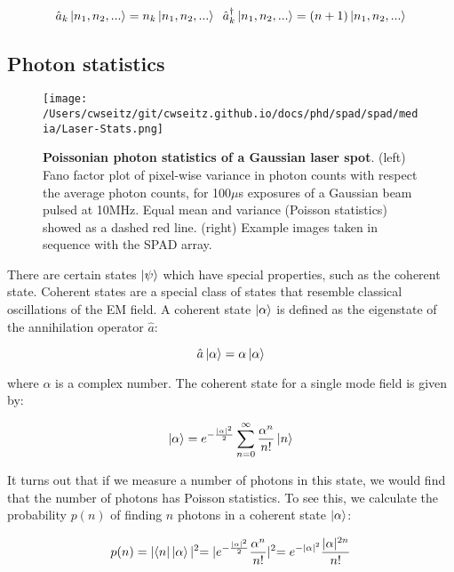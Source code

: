 \begin{equation*}
\hat{a}_k \ket{n_1, n_2, ...} = n_k \ket{n_1, n_2, ...} \;\;
\hat{a}_k^\dagger \ket{n_1, n_2, ...} = (n+1) \ket{n_1, n_2, ...}
\end{equation*}

\subsection{Photon statistics}

\begin{figure*}[t]
\centering
\texttt{[image: /Users/cwseitz/git/cwseitz.github.io/docs/phd/spad/spad/media/Laser-Stats.png]}
\caption{\textbf{Poissonian photon statistics of a Gaussian laser spot}. (left) Fano factor plot of pixel-wise variance in photon counts with respect the average photon counts, for 100$\mu$s exposures of a Gaussian beam pulsed at 10MHz. Equal mean and variance (Poisson statistics) showed as a dashed red line. (right) Example images taken in sequence with the SPAD array.}
\label{fig:fig29}
\end{figure*}    

There are certain states $\ket{\psi}$ which have special properties, such as the coherent state. Coherent states are a special class of states that resemble classical oscillations of the EM field. A coherent state $\ket{\alpha}$ is defined as the eigenstate of the annihilation operator $\hat{a}$:

\begin{equation*}
\hat{a} \ket{\alpha} = \alpha \ket{\alpha}
\end{equation*}

where $\alpha$ is a complex number. The coherent state for a single mode field is given by:

\begin{equation*}
\ket{\alpha} = e^{-\frac{\lvert\alpha\lvert^2}{2}} \sum_{n=0}^\infty \frac{\alpha^n}{n!} \ket{n}
\end{equation*}

It turns out that if we measure a number of photons in this state, we would find that the number of photons has Poisson statistics. To see this, we calculate the probability $p(n)$ of finding $n$ photons in a coherent state $\ket{\alpha}$:

\begin{equation*}
p(n) = \lvert \bra{n} \ket{\alpha} \lvert^2 = \lvert e^{-\frac{\lvert\alpha\lvert^2}{2}} \frac{\alpha^n}{n!} \lvert^2 = e^{-\lvert\alpha\lvert^2} \frac{\lvert\alpha\lvert^{2n}}{n!}
\end{equation*}

